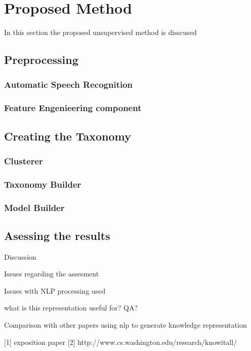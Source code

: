 \documentclass[4pt,a4paper,twocolumn]{article}
\begin{document}
\section{Proposed Method}


In this section the proposed unsupervised method is disscused

	\subsection{Preprocessing }
		\subsubsection{Automatic Speech Recognition}
		\subsubsection{Feature Engenieering component}

	\subsection{Creating the Taxonomy}
		\subsubsection{Clusterer}
		\subsubsection{Taxonomy Builder}
		\subsubsection{Model Builder}


	\subsection{Asessing the results}

	

Discussion

Issues regarding the assesment

Issues with NLP processing used

what is this representation useful for? QA?

Comparison with other papers using nlp to generate knowledge representation




[1] exposition paper
[2] http://www.cs.washington.edu/research/knowitall/


{}

\end{document}
